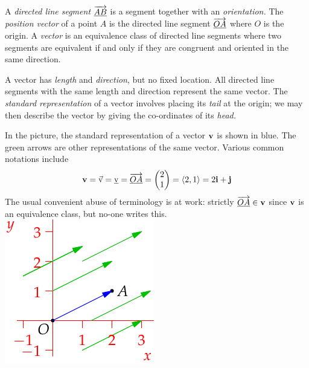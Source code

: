 \begin{defn}{}{}
A \emph{directed line segment} $\overrightarrow{\underline{AB}}$ is a segment together with an \emph{orientation.}\footnotemark\smallbreak
The \emph{position vector} of a point $A$ is the directed line segment $\overrightarrow{\underline{OA}}$ where $O$ is the origin.\smallbreak
A \emph{vector} is an equivalence class of directed line segments where two segments are equivalent if and only if they are congruent and oriented in the same direction.
\end{defn}


A vector has \emph{length} and \emph{direction}, but no fixed location. All directed line segments with the same length and direction represent the same vector. The \emph{standard representation} of a vector involves placing its \emph{tail} at the origin; we may then describe the vector by giving the co-ordinates of its \emph{head.}

\begin{example}[lower separated=false, sidebyside, sidebyside align=top seam, sidebyside gap=0pt, righthand width=0.3\linewidth]{}{}
In the picture, the standard representation of a vector ${\mathbf{v}}$ is shown in blue. The green arrows are other representations of the same vector. Various common notations include
\[{\mathbf{v}}=\vec{\mathrm{v}}=\underline{\mathrm{v}}=\overrightarrow{\underline{OA}}=\begin{pmatrix}2\\1\end{pmatrix}=\left\langle 2,1\right\rangle=2{\mathbf{i}}+{\mathbf{j}}\]
The usual convenient abuse of terminology is at work: strictly $\overrightarrow{\underline{OA}}\in{\mathbf{v}}$ since ${\mathbf{v}}$ is an equivalence class, but no-one writes this.
\tcblower
\flushright\includegraphics{analytic-defn}
\end{example}

